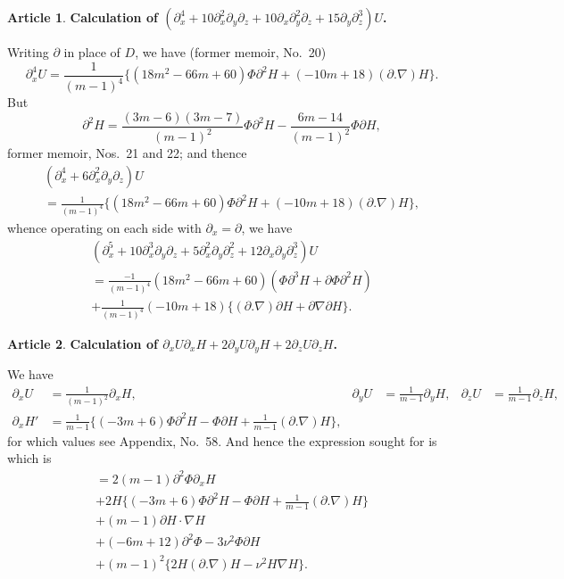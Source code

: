 \documentclass[11pt,a4paper]{article}
\theoremstyle{definition}
\newtheorem{art}{Article}[section]
\begin{document}
\setcounter{art}{30}
\begin{art}
\textbf{Calculation of $(\partial_x^4 + 10\partial_x^2\partial_y\partial_z + 10\partial_x\partial_y^2\partial_z
+ 15\partial_y\partial_z^3)U$.}

Writing $\partial$ in place of $D$, we have (former memoir, No.\ 20)
\[
\partial_x^4 U = \frac{1}{(m-1)^4}\{(18m^2 - 66m + 60)\Phi \partial^2 H
+ (-10m + 18)(\partial . \nabla)H\}.
\]
But
\[
\partial^2 H = \frac{(3m-6)(3m-7)}{(m-1)^2}\Phi \partial^2 H - \frac{6m-14}{(m-1)^2}\Phi \partial H,
\]
former memoir, Nos.\ 21 and 22; and thence
\begin{multline*}
(\partial_x^4 + 6\partial_x^2\partial_y\partial_z)U \\
= \frac{1}{(m-1)^4}\{(18m^2 - 66m + 60)\Phi \partial^2 H
+ (-10m + 18)(\partial . \nabla)H\},
\end{multline*}
whence operating on each side with $\partial_x = \partial$, we have
\begin{multline*}
(\partial_x^5 + 10\partial_x^3\partial_y\partial_z + 5\partial_x^2\partial_y\partial_z^2 + 12\partial_x\partial_y\partial_z^3)U \\
= \frac{-1}{(m-1)^4}(18m^2 - 66m + 60)(\Phi \partial^3 H + \partial\Phi \partial^2 H) \\
+ \frac{1}{(m-1)^4}(-10m + 18)\{(\partial . \nabla)\partial H + \partial \nabla \partial H\}.
\end{multline*}
\end{art}

\setcounter{art}{31}
\begin{art}
\textbf{Calculation of $\partial_x U \partial_x H + 2\partial_y U \partial_y H + 2\partial_z U \partial_z H$.}

We have
\begin{align*}
\partial_x U &= \frac{1}{(m-1)^2}\partial_x H, &
\partial_y U &= \frac{1}{m-1}\partial_y H, &
\partial_z U &= \frac{1}{m-1}\partial_z H, \\
\partial_x H' &= \frac{1}{m-1}\{(-3m+6)\Phi \partial^2 H - \Phi \partial H
+ \frac{1}{m-1}(\partial . \nabla)H\},
\end{align*}
for which values see Appendix, No.\ 58. And hence the expression sought for is
which is
\begin{multline*}
= 2(m-1)\partial^2 \Phi \partial_x H \\
+ 2H\{(-3m+6)\Phi \partial^2 H - \Phi \partial H + \tfrac{1}{m-1}(\partial . \nabla)H\} \\
+ (m-1)\partial H \cdot \nabla H \\
+ (-6m+12)\partial^2 \Phi - 3\nu^2 \Phi \partial H \\
+ (m-1)^2\{2H(\partial . \nabla)H - \nu^2 H \nabla H\}.
\end{multline*}
\end{art}
\end{document}
